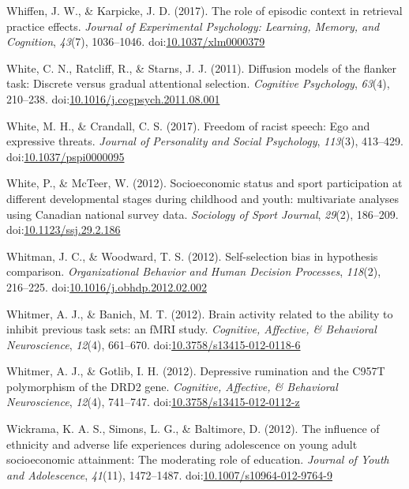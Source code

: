 \documentclass[english,man]{apa6}
\theoremstyle{definition}
\theoremstyle{definition}
\theoremstyle{definition}
\theoremstyle{remark}
\begin{document}
\hypertarget{ref-Whiffen2017}{}
Whiffen, J. W., \& Karpicke, J. D. (2017). The role of episodic context
in retrieval practice effects. \emph{Journal of Experimental Psychology:
Learning, Memory, and Cognition}, \emph{43}(7), 1036--1046.
doi:\href{https://doi.org/10.1037/xlm0000379}{10.1037/xlm0000379}

\hypertarget{ref-White2011}{}
White, C. N., Ratcliff, R., \& Starns, J. J. (2011). Diffusion models of
the flanker task: Discrete versus gradual attentional selection.
\emph{Cognitive Psychology}, \emph{63}(4), 210--238.
doi:\href{https://doi.org/10.1016/j.cogpsych.2011.08.001}{10.1016/j.cogpsych.2011.08.001}

\hypertarget{ref-White2017}{}
White, M. H., \& Crandall, C. S. (2017). Freedom of racist speech: Ego
and expressive threats. \emph{Journal of Personality and Social
Psychology}, \emph{113}(3), 413--429.
doi:\href{https://doi.org/10.1037/pspi0000095}{10.1037/pspi0000095}

\hypertarget{ref-White2012}{}
White, P., \& McTeer, W. (2012). Socioeconomic status and sport
participation at different developmental stages during childhood and
youth: multivariate analyses using Canadian national survey data.
\emph{Sociology of Sport Journal}, \emph{29}(2), 186--209.
doi:\href{https://doi.org/10.1123/ssj.29.2.186}{10.1123/ssj.29.2.186}

\hypertarget{ref-Whitman2012}{}
Whitman, J. C., \& Woodward, T. S. (2012). Self-selection bias in
hypothesis comparison. \emph{Organizational Behavior and Human Decision
Processes}, \emph{118}(2), 216--225.
doi:\href{https://doi.org/10.1016/j.obhdp.2012.02.002}{10.1016/j.obhdp.2012.02.002}

\hypertarget{ref-Whitmer2012a}{}
Whitmer, A. J., \& Banich, M. T. (2012). Brain activity related to the
ability to inhibit previous task sets: an fMRI study. \emph{Cognitive,
Affective, \& Behavioral Neuroscience}, \emph{12}(4), 661--670.
doi:\href{https://doi.org/10.3758/s13415-012-0118-6}{10.3758/s13415-012-0118-6}

\hypertarget{ref-Whitmer2012}{}
Whitmer, A. J., \& Gotlib, I. H. (2012). Depressive rumination and the
C957T polymorphism of the DRD2 gene. \emph{Cognitive, Affective, \&
Behavioral Neuroscience}, \emph{12}(4), 741--747.
doi:\href{https://doi.org/10.3758/s13415-012-0112-z}{10.3758/s13415-012-0112-z}

\hypertarget{ref-Wickrama2012}{}
Wickrama, K. A. S., Simons, L. G., \& Baltimore, D. (2012). The
influence of ethnicity and adverse life experiences during adolescence
on young adult socioeconomic attainment: The moderating role of
education. \emph{Journal of Youth and Adolescence}, \emph{41}(11),
1472--1487.
doi:\href{https://doi.org/10.1007/s10964-012-9764-9}{10.1007/s10964-012-9764-9}
\end{document}
